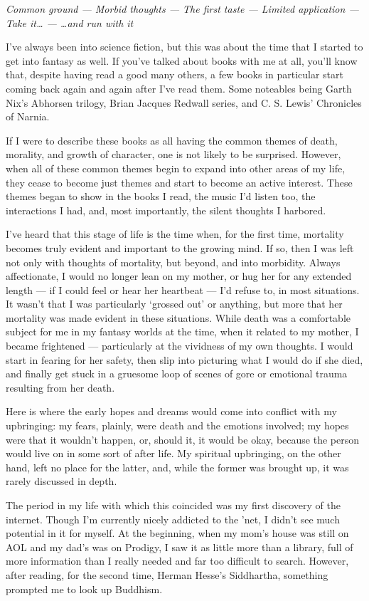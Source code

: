 \emph{Common ground --- Morbid thoughts --- The first taste --- Limited application --- Take it\ldots{} --- \ldots{}and run with it}

I've always been into science fiction, but this was about the time that I started to get into fantasy as well. If you've talked about books with me at all, you'll know that, despite having read a good many others, a few books in particular start coming back again and again after I've read them. Some noteables being Garth Nix's Abhorsen trilogy, Brian Jacques Redwall series, and C. S. Lewis' Chronicles of Narnia.

If I were to describe these books as all having the common themes of death, morality, and growth of character, one is not likely to be surprised. However, when all of these common themes begin to expand into other areas of my life, they cease to become just themes and start to become an active interest. These themes began to show in the books I read, the music I'd listen too, the interactions I had, and, most importantly, the silent thoughts I harbored.

I've heard that this stage of life is the time when, for the first time, mortality becomes truly evident and important to the growing mind. If so, then I was left not only with thoughts of mortality, but beyond, and into morbidity. Always affectionate, I would no longer lean on my mother, or hug her for any extended length --- if I could feel or hear her heartbeat --- I'd refuse to, in most situations. It wasn't that I was particularly `grossed out' or anything, but more that her mortality was made evident in these situations. While death was a comfortable subject for me in my fantasy worlds at the time, when it related to my mother, I became frightened --- particularly at the vividness of my own thoughts. I would start in fearing for her safety, then slip into picturing what I would do if she died, and finally get stuck in a gruesome loop of scenes of gore or emotional trauma resulting from her death.

Here is where the early hopes and dreams would come into conflict with my upbringing: my fears, plainly, were death and the emotions involved; my hopes were that it wouldn't happen, or, should it, it would be okay, because the person would live on in some sort of after life. My spiritual upbringing, on the other hand, left no place for the latter, and, while the former was brought up, it was rarely discussed in depth.

The period in my life with which this coincided was my first discovery of the internet. Though I'm currently nicely addicted to the 'net, I didn't see much potential in it for myself. At the beginning, when my mom's house was still on AOL and my dad's was on Prodigy, I saw it as little more than a library, full of more information than I really needed and far too difficult to search. However, after reading, for the second time, Herman Hesse's Siddhartha, something prompted me to look up Buddhism.

